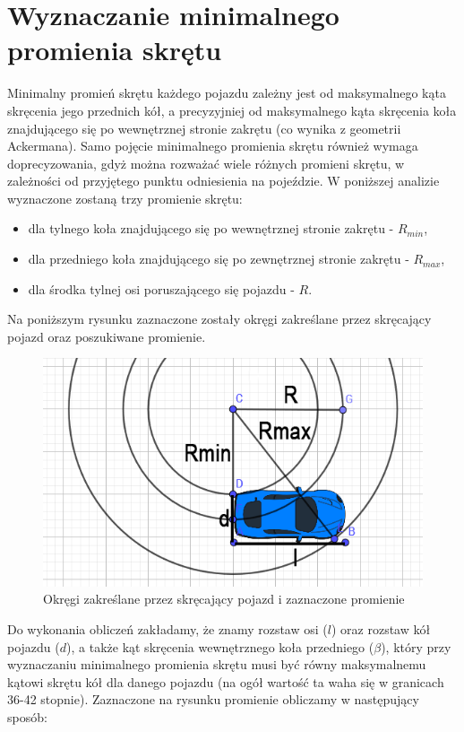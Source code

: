 \documentclass[a4paper,11pt,twoside]{report}
\theoremstyle{definition}
\begin{document}
\section{Wyznaczanie minimalnego promienia skrętu}

Minimalny promień skrętu każdego pojazdu zależny jest od maksymalnego kąta skręcenia jego przednich kół, a precyzyjniej od maksymalnego kąta skręcenia koła znajdującego się po wewnętrznej stronie zakrętu (co wynika z geometrii Ackermana). Samo pojęcie minimalnego promienia skrętu również wymaga doprecyzowania, gdyż można rozważać wiele różnych promieni skrętu, w zależności od przyjętego punktu odniesienia na pojeździe. W poniższej analizie wyznaczone zostaną trzy promienie skrętu:
\begin{itemize}
	\item dla tylnego koła znajdującego się po wewnętrznej stronie zakrętu - $R_{min}$,
	\item dla przedniego koła znajdującego się po zewnętrznej stronie zakrętu - $R_{max}$,
	\item dla środka tylnej osi poruszającego się pojazdu - $R$.
\end{itemize}

Na poniższym rysunku zaznaczone zostały okręgi zakreślane przez skręcający pojazd oraz poszukiwane promienie.

\begin{figure}[h!]
\centering
\includegraphics[scale=0.4]{vehicleTurningRadius}
\caption[Okręgi zakreślane przez skręcający pojazd i zaznaczone promienie]{Okręgi zakreślane przez skręcający pojazd i zaznaczone promienie}
\end{figure}

Do wykonania obliczeń zakładamy, że znamy rozstaw osi ($l$) oraz rozstaw kół pojazdu ($d$), a także kąt skręcenia wewnętrznego koła przedniego ($\beta$), który przy wyznaczaniu minimalnego promienia skrętu musi być równy maksymalnemu kątowi skrętu kół dla danego pojazdu (na ogół wartość ta waha się w granicach 36-42 stopnie). Zaznaczone na rysunku promienie obliczamy w następujący sposób:
\end{document}
